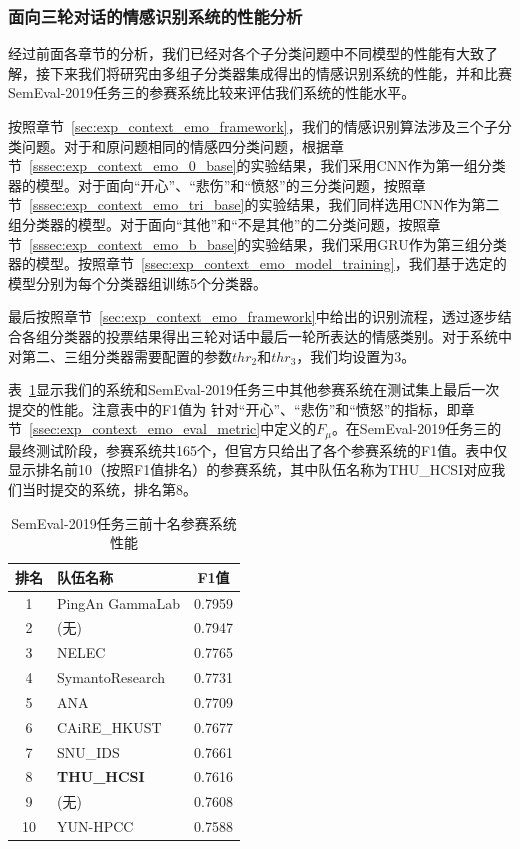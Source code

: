 \subsubsection{面向三轮对话的情感识别系统的性能分析}

经过前面各章节的分析，我们已经对各个子分类问题中不同模型的性能有大致了解，接下来我们将研究由多组子分类器集成得出的情感识别系统的性能，并和比赛SemEval-2019任务三的参赛系统比较来评估我们系统的性能水平。

按照章节~\ref{sec:exp_context_emo_framework}，我们的情感识别算法涉及三个子分类问题。对于和原问题相同的情感四分类问题，根据章节~\ref{sssec:exp_context_emo_0_base}的实验结果，我们采用CNN作为第一组分类器的模型。对于面向“开心”、“悲伤”和“愤怒”的三分类问题，按照章节~\ref{sssec:exp_context_emo_tri_base}的实验结果，我们同样选用CNN作为第二组分类器的模型。对于面向“其他”和“不是其他”的二分类问题，按照章节~\ref{sssec:exp_context_emo_b_base}的实验结果，我们采用GRU作为第三组分类器的模型。按照章节~\ref{ssec:exp_context_emo_model_training}，我们基于选定的模型分别为每个分类器组训练5个分类器。

最后按照章节~\ref{sec:exp_context_emo_framework}中给出的识别流程，透过逐步结合各组分类器的投票结果得出三轮对话中最后一轮所表达的情感类别。对于系统中对第二、三组分类器需要配置的参数$thr_2$和$thr_3$，我们均设置为3。

表~\ref{tab:exp_context_emo_other_comp}显示我们的系统和SemEval-2019任务三中其他参赛系统在测试集上最后一次提交的性能。注意表中的F1值为
针对“开心”、“悲伤”和“愤怒”的指标，即章节~\ref{ssec:exp_context_emo_eval_metric}中定义的$F_\mu$。在SemEval-2019任务三的最终测试阶段，参赛系统共165个，但官方只给出了各个参赛系统的F1值。表中仅显示排名前10（按照F1值排名）的参赛系统，其中队伍名称为THU\_HCSI对应我们当时提交的系统，排名第8。

\begin{table}[htb]
  \centering
  \begin{minipage}[t]{0.6\linewidth}
  \caption{SemEval-2019任务三前十名参赛系统性能} %
  \label{tab:exp_context_emo_other_comp}
    \begin{tabularx}{\linewidth}{c|X|c}
    \toprule[1.5pt]
    排名 & 队伍名称 & F1值 \\
    \hline
    1 & PingAn GammaLab & 0.7959 \\
    2 & (无) & 0.7947 \\
    3 & NELEC & 0.7765 \\
    4 & SymantoResearch & 0.7731 \\
    5 & ANA & 0.7709 \\
    6 & CAiRE\_HKUST & 0.7677 \\
    7 & SNU\_IDS & 0.7661 \\
    8 & \bf THU\_HCSI & 0.7616 \\
    9 & (无) & 0.7608 \\
    10 & YUN-HPCC & 0.7588 \\
    \bottomrule[1.5pt]
    \end{tabularx}
  \end{minipage}
\end{table}

